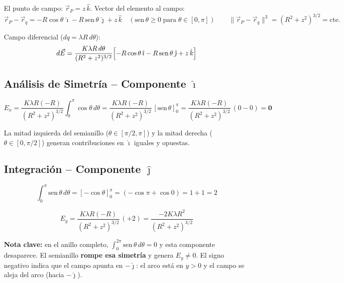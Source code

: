\documentclass[12pt,letterpaper]{article}
\begin{document}
El punto de campo: $\vec{r}_P = z\,\hat{k}$. Vector del elemento al campo:
\begin{equation*}
    \vec{r}_P-\vec{r}_q = -R\cos\theta\,\hat{\imath}-R\,\text{sen}\,\theta\,\hat{\jmath}+z\,\hat{k}
    \quad (\text{sen}\,\theta \geq 0\;\text{para}\;\theta\in[0,\pi])
    \qquad
    \|\vec{r}_P-\vec{r}_q\|^3 = (R^2+z^2)^{3/2} = \text{cte.}
\end{equation*}

Campo diferencial ($dq = \lambda R\,d\theta$):
\begin{equation*}
    d\vec{E}
    = \frac{K\lambda R\,d\theta}{(R^2+z^2)^{3/2}}
    \Bigl[-R\cos\theta\,\hat{\imath}-R\,\text{sen}\,\theta\,\hat{\jmath}+z\,\hat{k}\Bigr]
\end{equation*}

\subsection*{An\'alisis de Simetr\'ia -- Componente $\hat{\imath}$}

\begin{equation*}
    E_x = \frac{K\lambda R(-R)}{(R^2+z^2)^{3/2}}\int_0^{\pi}\cos\theta\,d\theta
    = \frac{K\lambda R(-R)}{(R^2+z^2)^{3/2}}\,[\text{sen}\,\theta]_0^{\pi}
    = \frac{K\lambda R(-R)}{(R^2+z^2)^{3/2}}\,(0-0) = \mathbf{0}
\end{equation*}

La mitad izquierda del semianillo ($\theta\in[\pi/2,\pi]$) y la mitad derecha
($\theta\in[0,\pi/2]$) generan contribuciones en $\hat{\imath}$ iguales y opuestas.

\subsection*{Integraci\'on -- Componente $\hat{\jmath}$}

\begin{equation*}
    \int_0^{\pi}\text{sen}\,\theta\,d\theta
    = [-\cos\theta]_0^{\pi} = (-\cos\pi+\cos 0) = 1+1 = 2
\end{equation*}

\begin{equation*}
    E_y = \frac{K\lambda R(-R)}{(R^2+z^2)^{3/2}}\,(+2)
    = \frac{-2K\lambda R^2}{(R^2+z^2)^{3/2}}
\end{equation*}

\textbf{Nota clave:} en el anillo completo, $\int_0^{2\pi}\text{sen}\,\theta\,d\theta = 0$ y esta
componente desaparece. El semianillo \textbf{rompe esa simetr\'ia} y genera $E_y\neq0$.
El signo negativo indica que el campo apunta en $-\hat{\jmath}$: el arco est\'a en $y>0$
y el campo se aleja del arco (hacia $-\hat{\jmath}$).
\end{document}
